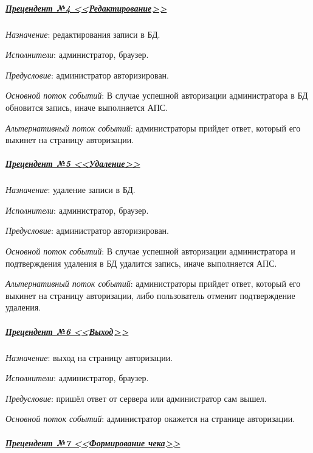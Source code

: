 
\subparagraph{\underline{Прецендент №4 <<Редактирование>>}} \hspace{0pt}

\textit{Назначение}: редактирования записи в БД.

\textit{Исполнители}: администратор, браузер.

\textit{Предусловие}: администратор авторизирован.

\textit{Основной поток событий}: В случае успешной авторизации администратора в БД обновится запись, иначе выполняется АПС.

\textit{Альтернативный поток событий}: администраторы прийдет ответ, который его выкинет на страницу авторизации.


\subparagraph{\underline{Прецендент №5 <<Удаление>>}} \hspace{0pt}

\textit{Назначение}: удаление записи в БД.

\textit{Исполнители}: администратор, браузер.

\textit{Предусловие}: администратор авторизирован.

\textit{Основной поток событий}: В случае успешной авторизации администратора и подтверждения удаления в БД удалится запись, иначе выполняется АПС.

\textit{Альтернативный поток событий}: администраторы прийдет ответ, который его выкинет на страницу авторизации, либо пользователь отменит подтверждение удаления.


\subparagraph{\underline{Прецендент №6 <<Выход>>}} \hspace{0pt}

\textit{Назначение}: выход на страницу авторизации.

\textit{Исполнители}: администратор, браузер.

\textit{Предусловие}: пришёл ответ от сервера или администратор сам вышел.

\textit{Основной поток событий}: администратор окажется на странице авторизации.


\subparagraph{\underline{Прецендент №7 <<Формирование чека>>}} \hspace{0pt}

